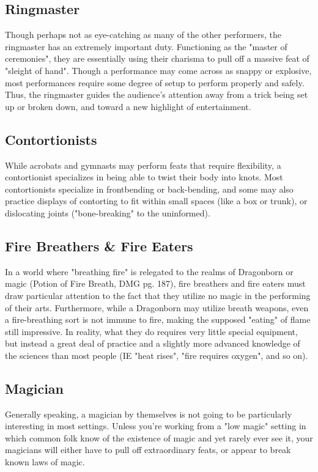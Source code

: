 \documentclass[10pt,a4paper,twoside,twocolumn,openany,bg=print,nodeprecatedcode]{dndbook}
\begin{document}
\subsection{Ringmaster}
Though perhaps not as eye-catching as many of the other performers, the ringmaster has an extremely important duty. Functioning as the "master of ceremonies", they are essentially using their charisma to pull off a massive feat of "sleight of hand". Though a performance may come across as snappy or explosive, most performances require some degree of setup to perform properly and safely. Thus, the ringmaster guides the audience's attention away from a trick being set up or broken down, and toward a new highlight of entertainment.
\subsection{Contortionists}
While acrobats and gymnasts may perform feats that require flexibility, a contortionist specializes in being able to twist their body into knots. Most contortionists specialize in frontbending or back-bending, and some may also practice displays of contorting to fit within small spaces (like a box or trunk), or dislocating joints ("bone-breaking" to the uninformed).
\subsection{Fire Breathers \& Fire Eaters}
In a world where "breathing fire" is relegated to the realms of Dragonborn or magic (Potion of Fire Breath, DMG pg. 187), fire breathers and fire eaters must draw particular attention to the fact that they utilize no magic in the performing of their arts. Furthermore, while a Dragonborn may utilize breath weapons, even a fire-breathing sort is not immune to fire, making the supposed "eating" of flame still impressive. In reality, what they do requires very little special equipment, but instead a great deal of practice and a slightly more advanced knowledge of the sciences than most people (IE "heat rises", "fire requires oxygen", and so on).
\subsection{Magician}
Generally speaking, a magician by themselves is not going to be particularly interesting in most settings. Unless you're working from a "low magic" setting in which common folk know of the existence of magic and yet rarely ever see it, your magicians will either have to pull off extraordinary feats, or appear to break known laws of magic.
\end{document}
